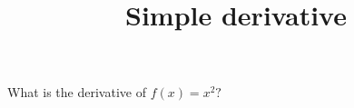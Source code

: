 \documentclass{article}
\begin{document}
\begin{category}
\begin{question}[essay]
\title{Simple derivative}
What is the derivative of $f(x)=x^2?$


\end{question}

\end{category}
\end{document}
